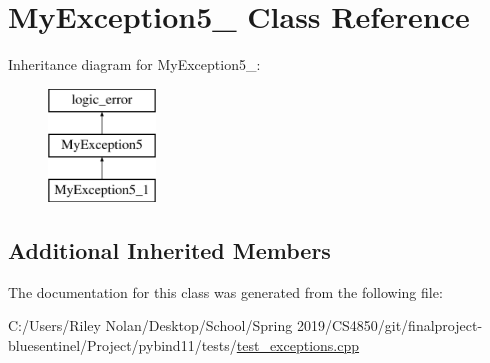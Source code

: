 \hypertarget{class_my_exception5__1}{}\section{My\+Exception5\+\_ Class Reference}
\label{class_my_exception5__1}
Inheritance diagram for My\+Exception5\+\_\+:\begin{figure}[H]
\begin{center}
\leavevmode
\includegraphics[height=3.000000cm]{class_my_exception5__1}
\end{center}
\end{figure}
\subsection*{Additional Inherited Members}


The documentation for this class was generated from the following file\+:\begin{DoxyCompactItemize}
\item 
C\+:/\+Users/\+Riley Nolan/\+Desktop/\+School/\+Spring 2019/\+C\+S4850/git/finalproject-\/bluesentinel/\+Project/pybind11/tests/\mbox{\hyperlink{test__exceptions_8cpp}{test\+\_\+exceptions.\+cpp}}\end{DoxyCompactItemize}
